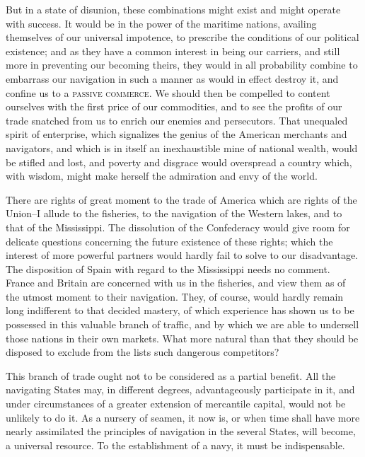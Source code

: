 But in a state of disunion, these combinations might exist and might operate with success. 
It would be in the power of the maritime nations, availing themselves of our universal impotence, to prescribe the conditions of our political existence; and as they have a common interest in being our carriers, and still more in preventing our becoming theirs, they would in all probability combine to embarrass our navigation in such a manner as would in effect destroy it, and confine us to a \textsc{passive commerce}. 
We should then be compelled to content ourselves with the first price of our commodities, and to see the profits of our trade snatched from us to enrich our enemies and persecutors. 
That unequaled spirit of enterprise, which signalizes the genius of the American merchants and navigators, and which is in itself an inexhaustible mine of national wealth, would be stifled and lost, and poverty and disgrace would overspread a country which, with wisdom, might make herself the admiration and envy of the world.

There are rights of great moment to the trade of America which are rights of the Union--I allude to the fisheries, to the navigation of the Western lakes, and to that of the Mississippi. 
The dissolution of the Confederacy would give room for delicate questions concerning the future existence of these rights; which the interest of more powerful partners would hardly fail to solve to our disadvantage. 
The disposition of Spain with regard to the Mississippi needs no comment. 
France and Britain are concerned with us in the fisheries, and view them as of the utmost moment to their navigation. 
They, of course, would hardly remain long indifferent to that decided mastery, of which experience has shown us to be possessed in this valuable branch of traffic, and by which we are able to undersell those nations in their own markets. 
What more natural than that they should be disposed to exclude from the lists such dangerous competitors?

This branch of trade ought not to be considered as a partial benefit. 
All the navigating States may, in different degrees, advantageously participate in it, and under circumstances of a greater extension of mercantile capital, would not be unlikely to do it. 
As a nursery of seamen, it now is, or when time shall have more nearly assimilated the principles of navigation in the several States, will become, a universal resource. 
To the establishment of a navy, it must be indispensable.

